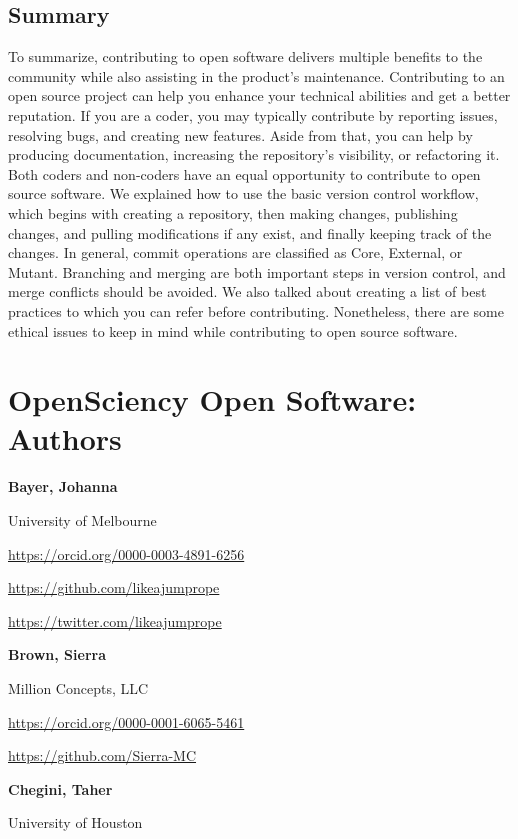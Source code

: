 \documentclass[
  letterpaper,
  DIV=11,
  numbers=noendperiod]{scrreport}
\begin{document}
\hypertarget{summary-8}{%
\section{Summary}\label{summary-8}}

To summarize, contributing to open software delivers multiple benefits
to the community while also assisting in the product's maintenance.
Contributing to an open source project can help you enhance your
technical abilities and get a better reputation. If you are a coder, you
may typically contribute by reporting issues, resolving bugs, and
creating new features. Aside from that, you can help by producing
documentation, increasing the repository's visibility, or refactoring
it. Both coders and non-coders have an equal opportunity to contribute
to open source software. We explained how to use the basic version
control workflow, which begins with creating a repository, then making
changes, publishing changes, and pulling modifications if any exist, and
finally keeping track of the changes. In general, commit operations are
classified as Core, External, or Mutant. Branching and merging are both
important steps in version control, and merge conflicts should be
avoided. We also talked about creating a list of best practices to which
you can refer before contributing. Nonetheless, there are some ethical
issues to keep in mind while contributing to open source software.

\hypertarget{opensciency-open-software-authors}{%
\chapter{OpenSciency Open Software:
Authors}\label{opensciency-open-software-authors}}

\textbf{Bayer, Johanna}

University of Melbourne

\url{https://orcid.org/0000-0003-4891-6256}

\url{https://github.com/likeajumprope}

\url{https://twitter.com/likeajumprope}

\textbf{Brown, Sierra}

Million Concepts, LLC

\url{https://orcid.org/0000-0001-6065-5461}

\url{https://github.com/Sierra-MC}

\textbf{Chegini, Taher}

University of Houston
\end{document}
